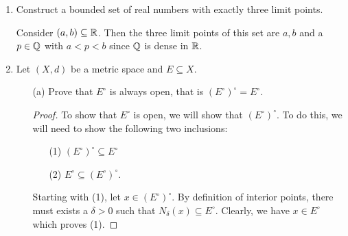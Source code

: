 \documentclass[a4paper]{article}
\begin{document}
\begin{enumerate}
\begin{enumerate}
\begin{proof}
                Now with (2), let \( x \in \overline{E}' \). Then for all \( \epsilon > 0  \), \( {N}_{\epsilon}(x) \cap \overline{E} \setminus  \{ x \} \neq \emptyset \). From this nonempty intersection, pick \( y \neq x   \) such that \( y \in \overline{E} \); that is, \( y \in E  \) or \( y \in E' \). If \( y \in E  \), then \( x  \) is a limit point of \( E  \) and thus \( x \in E' \). If \( y \in E' \), then \( y  \) is a limit point of \( E  \). Hence, for all \( \delta > 0  \) \( {N}_{\delta}(y) \cap E \setminus  \{ y \} \neq \emptyset \). From this, we can pick \( q \neq y \neq x  \) such that \( q \in E  \). But this tell us that  
                \[  {N}_{\epsilon}(x) \cap E \setminus \{ x \} \neq \emptyset, \]
                proving that \( x  \) is a limit point of \( E \) and so \( x \in E' \). 
                \end{proof}
            \item[(c)] Construct an example that shows \( E  \) and \( E' \) do not necessarily have the same limit points?
                \begin{proof}
                Suppose we have the following set \( E = \{ x < \frac{ 1 }{ n }  : n \in \N, x \in \R  \}  \) and its set of limit points \( E' = \{ \frac{ 1 }{ n }  : n \in \N  \}   \). Do these two sets necessarily have the same limit points?
                \end{proof}
        \end{enumerate}
        \item Construct a bounded set of real numbers with exactly three limit points.
            \begin{solution}
            Consider \( (a,b) \subseteq \mathbb{R}  \). Then the three limit points of this set are \( a,b \) and a \( p \in \mathbb{Q}  \) with \( a < p < b \) since \( \mathbb{Q}  \) is dense in \( \mathbb{R}  \).
            \end{solution}
        \item Let \( (X,d)  \) be a metric space and \( E \subseteq X  \).
            \begin{enumerate}
                \item[(a)] Prove that \( E^{\circ} \) is always open, that is \( (E^{\circ})^{\circ} = E^{\circ} \).
                    \begin{proof}
                    To show that \( E^{\circ} \) is open, we will show that \( (E^{\circ})^{\circ} \). To do this, we will need to show the following two inclusions:
                    \begin{enumerate}
                        \item[(1)] \( (E^{\circ})^{\circ} \subseteq E^{\circ} \)
                        \item[(2)] \( E^{\circ} \subseteq (E^{\circ})^{\circ} \).
                    \end{enumerate}
                    Starting with (1), let \( x \in (E^{\circ})^{\circ} \). By definition of interior points, there must exists a \( \delta > 0  \) such that \( {N}_{\delta}(x) \subseteq  E^{\circ} \). Clearly, we have \( x \in E^{\circ} \) which proves (1).   


\end{proof}
\end{enumerate}
\end{enumerate}
\end{document}
